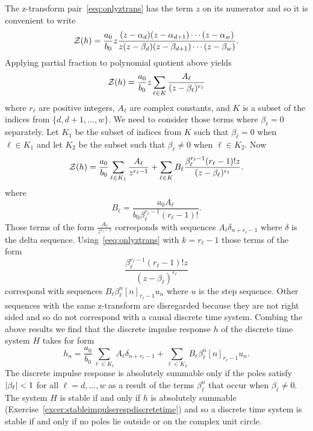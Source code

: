 The z-transform pair~\eqref{eeq:onlyztrans} has the term $z$ on its numerator and so it is convenient to write
\[
{\mathcal Z}(h) = \frac{a_0}{b_0} z \frac{(z-\alpha_d)(z - \alpha_{d+1})\cdots(z - \alpha_{w})}{z(z-\beta_d)(z - \beta_{d+1})\cdots(z - \beta_{w})}.
\]
Applying partial fraction to polynomial quotient above yields
\[
{\mathcal Z}(h) = \frac{a_0}{b_0} z \sum_{\ell \in K} \frac{A_\ell }{(z - \beta_\ell)^{r_\ell}}
\] 
where $r_\ell$ are positive integers, $A_\ell$ are complex constants, and $K$ is a subset of the indices from $\{d,d+1,\dots,w\}$.  We need to consider those terms where $\beta_\ell = 0$ separately.  Let $K_1$ be the subset of indices from $K$ such that $\beta_\ell = 0$ when $\ell \in K_1$ and let $K_2$ be the subset such that $\beta_\ell \neq 0$ when $\ell \in K_2$.  Now 
\[
{\mathcal Z}(h) = \frac{a_0}{b_0} \sum_{\ell \in K_1} \frac{A_\ell }{z^{r_\ell-1}} + \sum_{\ell \in K} B_\ell \frac{  \beta_\ell^{r_\ell-1} (r_\ell-1)! z }{(z - \beta_\ell)^{r_\ell}}.
\] 
where
\[
B_\ell = \frac{a_0 A_\ell}{b_0 \beta_\ell^{r_\ell-1} (r_\ell-1)! }.
\] 
Those terms of the form $\frac{A_\ell }{z^{r_\ell-1}}$ corresponds with sequences $A_\ell \delta_{n+r_\ell-1}$ where $\delta$ is the delta sequence.  Using~\eqref{eeq:onlyztrans} with $k = r_\ell - 1$ those terms of the form 
\[
\frac{\beta_\ell^{r_\ell-1} (r_\ell-1)! z }{(z - \beta_\ell)^{r_\ell}}
\]
correspond with sequences $B_\ell \beta_\ell^n [n]_{r_\ell-1} u_n$ where $u$ is the step sequence.  Other sequences with the same z-transform are disregarded because they are not right sided and so do not correspond with a causal discrete time system.  Combing the above results we find that the discrete impulse response $h$ of the discrete time system $H$ takes for form
\[
h_n = \frac{a_0}{b_0} \sum_{\ell \in K_1} A_\ell \delta_{n+r_\ell-1} + \sum_{\ell \in K_2} B_\ell \beta_\ell^n [n]_{r_\ell-1} u_n.
\]
The discrete impulse response is absolutely summable only if the poles satisfy $\left\vert \beta_\ell \right\vert < 1$ for all $\ell = d,\dots,w$ as a result of the terms $\beta_\ell^n$ that occur when $\beta_\ell \neq 0$.  The system $H$ is stable if and only if $h$ is absolutely summable (Exercise~\ref{excer:stableimpulserespdiscretetime}) and so a discrete time system is stable if and only if no poles lie outside or on the complex unit circle.

